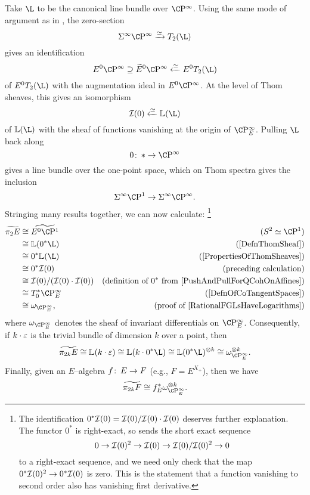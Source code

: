 \begin{example}\label{Pi2AndInvariantDiffls}
Take $\L$ to be the canonical line bundle over $\CP^\infty$.  Using the same mode of argument as in , the zero-section \[\Susp^\infty \CP^\infty \xrightarrow{\simeq} T_2(\L)\] gives an identification \[E^0 \CP^\infty \supseteq \widetilde E^0 \CP^\infty \xleftarrow{\simeq} E^0 T_2(\L)\] of $E^0 T_2(\L)$ with the augmentation ideal in $E^0 \CP^\infty$.  At the level of Thom sheaves, this gives an isomorphism \[\sheaf I(0) \xleftarrow{\simeq} \ThomSheaf{\L}\] of $\ThomSheaf{\L}$ with the sheaf of functions vanishing at the origin of $\CP^\infty_E$.  Pulling $\L$ back along \[0\co * \to \CP^\infty\] gives a line bundle over the one-point space, which on Thom spectra gives the inclusion \[\Susp^\infty \CP^1 \to \Susp^\infty \CP^\infty.\]  Stringing many results together, we can now calculate:%
\footnote{The identification $0^* \mathcal{I}(0) = \mathcal{I}(0) / \mathcal{I}(0) \cdot \mathcal{I}(0)$ deserves further explanation.  The functor $0^*$ is right-exact, so sends the short exact sequence \[0 \to \mathcal{I}(0)^2 \to \mathcal{I}(0) \to \mathcal{I}(0) / \mathcal{I}(0)^2 \to 0\] to a right-exact sequence, and we need only check that the map $0^* \mathcal{I}(0)^2 \to 0^* \mathcal{I}(0)$ is zero.  This is the statement that a function vanishing to second order also has vanishing first derivative.}
\begin{align*}
\widetilde{\pi_2 E} & \cong \widetilde{E^0 \CP^1} & \text{($S^2 \simeq \CP^1$)} \\
& \cong \ThomSheaf{0^* \L} & \text{(\Cref{DefnThomSheaf})} \\
& \cong 0^* \ThomSheaf{\L} & \text{(\Cref{PropertiesOfThomSheaves})} \\
& \cong 0^* \sheaf I(0) & \text{(preceding calculation)} \\
& \cong \sheaf I(0) / (\sheaf I(0) \cdot \sheaf I(0)) & \text{(definition of $0^*$ from \Cref{PushAndPullForQCohOnAffines})} \\
& \cong T^*_0 \CP^\infty_E & \text{(\Cref{DefnOfCoTangentSpaces})} \\
& \cong \omega_{\CP^\infty_E}, & \text{(proof of \Cref{RationalFGLsHaveLogarithms})}
\end{align*}
where $\omega_{\CP^\infty_E}$ denotes the sheaf of invariant differentials on $\CP^\infty_E$.  Consequently, if $k \cdot \varepsilon$ is the trivial bundle of dimension $k$ over a point, then \[\widetilde{\pi_{2k} E} \cong \ThomSheaf{k \cdot \eps} \cong \ThomSheaf{k \cdot 0^* \L} \cong \ThomSheaf{0^* \L}^{\otimes k} \cong \omega_{\CP^\infty_E}^{\otimes k}.\]  Finally, given an $E$--algebra $f \colon\thinspace E \to F$ (e.g., $F = E^{X_+}$), then we have \[\widetilde{\pi_{2k} F} \cong f_E^* \omega_{\CP^\infty_E}^{\otimes k}.\]
\end{example}

